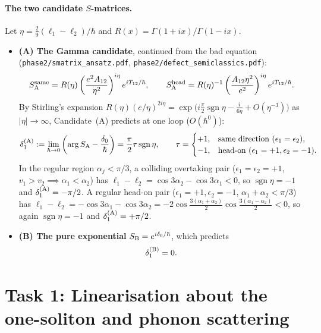 \documentclass[11pt,a4paper]{article}
\theoremstyle{remark}
\begin{document}
\paragraph{The two candidate $S$-matrices.} Let $\eta=\tfrac29(\ell_1-\ell_2)/\hbar$ and $R(x)=\Gamma(1+ix)/\Gamma(1-ix)$.
\begin{itemize}
\item \textbf{(A) The Gamma candidate}, continued from the bad equation (\texttt{phase2/smatrix\_ansatz.pdf}, \texttt{phase2/defect\_semiclassics.pdf}):
\begin{equation}\label{eq:candA}
S_{\rm A}^{\rm same}=R(\eta)\left(\frac{e^2 A_{12}}{\eta^2}\right)^{i\eta}e^{iT_{12}/\hbar},\qquad
S_{\rm A}^{\rm head}=R(\eta)^{-1}\left(\frac{A_{12}\eta^2}{e^2}\right)^{i\eta}e^{iT_{12}/\hbar}.
\end{equation}
By Stirling's expansion $R(\eta)(e/\eta)^{2i\eta}=\exp\big(i\frac{\pi}{2}\operatorname{sgn}\eta-\frac{i}{6\eta}+O(\eta^{-3})\big)$ as $|\eta|\to\infty$, Candidate~(A) predicts at one loop ($O(\hbar^0)$):
\begin{equation}\label{eq:candA_oneloop}
\delta_1^{\rm (A)}:=\lim_{\hbar\to 0}\left(\arg S_{\rm A}-\frac{\delta_0}{\hbar}\right)=\frac{\pi}{2}\tau\operatorname{sgn}\eta,
\qquad \tau=\begin{cases}+1,&\text{same direction }(\epsilon_1=\epsilon_2),\\-1,&\text{head-on }(\epsilon_1=+1,\epsilon_2=-1).\end{cases}
\end{equation}
In the regular region $\alpha_j<\pi/3$, a colliding overtaking pair ($\epsilon_1=\epsilon_2=+1$, $v_1>v_2\implies\alpha_1<\alpha_2$) has $\ell_1-\ell_2=\cos 3\alpha_2-\cos 3\alpha_1<0$, so $\operatorname{sgn}\eta=-1$ and $\delta_1^{\rm (A)}=-\pi/2$. A regular head-on pair ($\epsilon_1=+1,\epsilon_2=-1$, $\alpha_1+\alpha_2<\pi/3$) has $\ell_1-\ell_2=-\cos 3\alpha_1-\cos 3\alpha_2=-2\cos\frac{3(\alpha_1+\alpha_2)}{2}\cos\frac{3(\alpha_1-\alpha_2)}{2}<0$, so again $\operatorname{sgn}\eta=-1$ and $\delta_1^{\rm (A)}=+\pi/2$.
\item \textbf{(B) The pure exponential} $S_{\rm B}=e^{i\delta_0/\hbar}$, which predicts
\begin{equation}\label{eq:candB_oneloop}
\delta_1^{\rm (B)}=0.
\end{equation}
\end{itemize}

\section{Task 1: Linearisation about the one-soliton and phonon scattering}\label{sec:task1}
\end{document}
